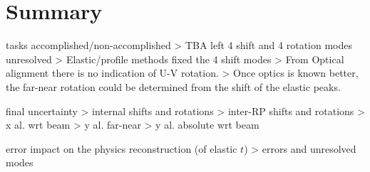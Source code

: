 
\iffalse
RP position corrections (only dy vs. y data used)								
	45 near		45 far		56 near		56 far	
	x	y	x	y	x	y	x	y
2010_09_21	-33	0	-48	69	-23	0	-25	38
2010_10_05	-43	0	-38	70	-24	0	-24	13
2010_10_07	2	0	-14	72	-38	0	-27	6
2010_10_24	-46	0	-37	87	-38	0	-15	-1
2010_10_26	-24	0	-23	80	-35	0	-68	-8
2010_10_29-30	-26	0	-7	80	-7	0	-6	-1
								
								
RP position corrections (y distributions data used)								
	45 near		45 far		56 near		56 far	
	x	y	x	y	x	y	x	y
2010_09_21	-31	-54	-47	25	-26	-61	-27	-26
2010_10_05	-46	72	-39	93	-27	-82	-33	-214
2010_10_07	0	43	-14	86	-40	-49	-30	-77
2010_10_24	-43	-88	-34	-20	-36	40	-14	9
2010_10_26	-28	92	-25	160	-46	-248	-76	-218
2010_10_29-30	-26	12	-7	100	-8	-37	-7	-33
\fi


\section[al sum]{Summary}

\> tasks accomplished/non-accomplished
\>> TBA left 4 shift and 4 rotation modes unresolved
\>> Elastic/profile methods fixed the 4 shift modes
\>> From Optical alignment there is no indication of U-V rotation.
\>> Once optics is known better, the far-near rotation could be determined from the shift of the elastic peaks.

\> final uncertainty
\>> internal shifts and rotations
\>> inter-RP shifts and rotations
\>> x al. wrt beam
\>> y al. far-near
\>> y al. absolute wrt beam

\> error impact on the physics reconstruction (of elastic $t$)
\>> errors and unresolved modes
